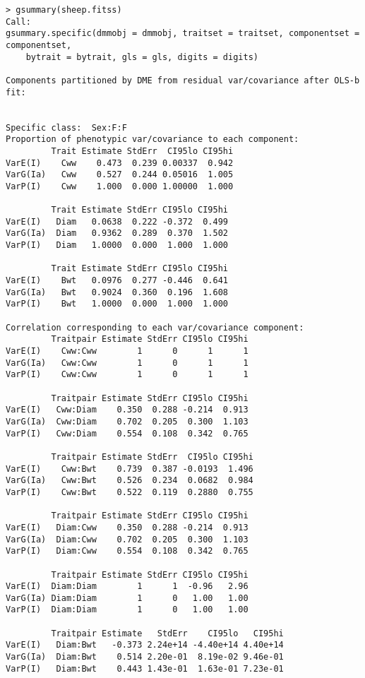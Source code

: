 \documentclass[titlepage]{article}  %
\begin{document}
\begin{verbatim}
> gsummary(sheep.fitss)
Call:
gsummary.specific(dmmobj = dmmobj, traitset = traitset, componentset = componentset, 
    bytrait = bytrait, gls = gls, digits = digits)

Components partitioned by DME from residual var/covariance after OLS-b fit:


Specific class:  Sex:F:F 
Proportion of phenotypic var/covariance to each component:
         Trait Estimate StdErr  CI95lo CI95hi
VarE(I)    Cww    0.473  0.239 0.00337  0.942
VarG(Ia)   Cww    0.527  0.244 0.05016  1.005
VarP(I)    Cww    1.000  0.000 1.00000  1.000

         Trait Estimate StdErr CI95lo CI95hi
VarE(I)   Diam   0.0638  0.222 -0.372  0.499
VarG(Ia)  Diam   0.9362  0.289  0.370  1.502
VarP(I)   Diam   1.0000  0.000  1.000  1.000

         Trait Estimate StdErr CI95lo CI95hi
VarE(I)    Bwt   0.0976  0.277 -0.446  0.641
VarG(Ia)   Bwt   0.9024  0.360  0.196  1.608
VarP(I)    Bwt   1.0000  0.000  1.000  1.000

Correlation corresponding to each var/covariance component:
         Traitpair Estimate StdErr CI95lo CI95hi
VarE(I)    Cww:Cww        1      0      1      1
VarG(Ia)   Cww:Cww        1      0      1      1
VarP(I)    Cww:Cww        1      0      1      1

         Traitpair Estimate StdErr CI95lo CI95hi
VarE(I)   Cww:Diam    0.350  0.288 -0.214  0.913
VarG(Ia)  Cww:Diam    0.702  0.205  0.300  1.103
VarP(I)   Cww:Diam    0.554  0.108  0.342  0.765

         Traitpair Estimate StdErr  CI95lo CI95hi
VarE(I)    Cww:Bwt    0.739  0.387 -0.0193  1.496
VarG(Ia)   Cww:Bwt    0.526  0.234  0.0682  0.984
VarP(I)    Cww:Bwt    0.522  0.119  0.2880  0.755

         Traitpair Estimate StdErr CI95lo CI95hi
VarE(I)   Diam:Cww    0.350  0.288 -0.214  0.913
VarG(Ia)  Diam:Cww    0.702  0.205  0.300  1.103
VarP(I)   Diam:Cww    0.554  0.108  0.342  0.765

         Traitpair Estimate StdErr CI95lo CI95hi
VarE(I)  Diam:Diam        1      1  -0.96   2.96
VarG(Ia) Diam:Diam        1      0   1.00   1.00
VarP(I)  Diam:Diam        1      0   1.00   1.00

         Traitpair Estimate   StdErr    CI95lo   CI95hi
VarE(I)   Diam:Bwt   -0.373 2.24e+14 -4.40e+14 4.40e+14
VarG(Ia)  Diam:Bwt    0.514 2.20e-01  8.19e-02 9.46e-01
VarP(I)   Diam:Bwt    0.443 1.43e-01  1.63e-01 7.23e-01


\end{verbatim}
\end{document}
